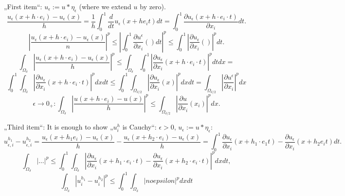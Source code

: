 \documentclass[12pt]{article}					%
\begin{document}
\begin{veta}
\begin{dukazin}
		„First item“: $u_\epsilon := u * \eta_\epsilon$ (where we extend $u$ by zero).
		$$ \frac{u_\epsilon(x + h·e_i) - u_\epsilon(x)}{h} = \frac{1}{h} \int_0^1 \frac{d}{dt} u_\epsilon(x + h e_i t) dt = \int_0^1 \frac{\partial u_\epsilon(x + h·e_i·t)}{\partial x_i} dt. $$
		$$ \left|\frac{u_\epsilon(x + h·e_i) - u_\epsilon(x)}{n}\right|^p ≤ \left| \int_0^1 \frac{\partial u^\epsilon}{\partial x_i}() dt \right|^p ≤ \int_0^1 \left|\frac{\partial u_\epsilon}{\partial x_i}()\right|^p dt. $$
		$$ \int_{\Omega_\delta} \left|\frac{u_\epsilon(x + h·e_i) - u_\epsilon(x)}{h}\right|^p ≤ \int_{\Omega_\delta} \int_0^1 \left| \frac{\partial u_\epsilon}{\partial x_i}(x + h·e_i·t) \right|^p dt dx =  $$
		$$ \int_0^1 \int_{\Omega_\delta} \left| \frac{\partial u_\epsilon}{\partial x_i}(x + h·e_i·t) \right|^p dx dt ≤ \int_0^1 \int_{\Omega_{\delta / 2}} \left|\frac{\partial u_\epsilon}{\partial x_i}(x)\right|^p dx dt = \int_{\Omega_{\delta / 2}} \left| \frac{\partial u^\epsilon}{\partial x_i} \right|^p dx $$
		$$ \epsilon \rightarrow 0_+: \int_{\Omega_\delta} \left|\frac{u(x + h·e_i) - u(x)}{h}\right|^p ≤ \int_{\Omega_{\delta / 2}} \left|\frac{\partial u}{\partial x_i} (x_i)\right|^p dx. $$

		„Third item“: It is enough to show „$u_i^h$ is Cauchy“: $\epsilon > 0$, $u_\epsilon := u * \eta_\epsilon$:
		$$ u_{\epsilon, i}^{h_1} - u_{\epsilon, i}^{h_2} = \frac{u_\epsilon(x + h_1 e_i) - u_\epsilon(x)}{h} - \frac{u_\epsilon(x + h_2·e_i) - u_\epsilon(x)}{h} = \int_0^1 \frac{\partial u_\epsilon}{\partial x_i}(x + h_1·e_1 t) - \frac{\partial u_\epsilon}{\partial x_i}(x + h_2 e_i t) dt. $$
		$$ \int_{\Omega_\delta} |…|^p ≤ \int_0^1 \int_{\Omega_\delta} \left|\frac{\partial u_\epsilon}{\partial x_i}(x + h_1·e_i·t) - \frac{\partial u_\epsilon}{\partial x_i}(x + h_2·e_i·t)\right|^p dx dt, $$
		$$ \int_{\Omega_\delta} |u_i^{h_1} - u_i^{h_2}|^p ≤ \int_0^1 \int_{\Omega_\delta} | no epsilon |^p dx dt $$
	\end{dukazin}
\end{veta}
\end{document}

